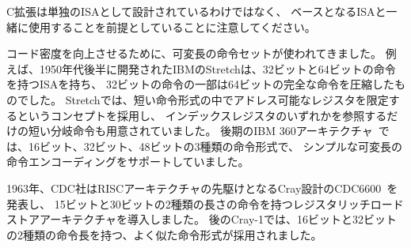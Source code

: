 \begin{comment}
It is important to note that the C extension is not designed to be a
stand-alone ISA, and is meant to be used alongside a base ISA.
\end{comment}

C拡張は単独のISAとして設計されているわけではなく、
ベースとなるISAと一緒に使用することを前提としていることに注意してください。

\begin{commentary}
\begin{comment}
Variable-length instruction sets have long been used to improve code
density.  For example, the IBM Stretch~\cite{stretch}, developed in
the late 1950s, had an ISA with 32-bit and 64-bit instructions, where
some of the 32-bit instructions were compressed versions of the full
64-bit instructions.  Stretch also employed the concept of limiting
the set of registers that were addressable in some of the shorter
instruction formats, with short branch instructions that could only
refer to one of the index registers.  The later IBM 360
architecture~\cite{ibm360} supported a simple variable-length
instruction encoding with 16-bit, 32-bit, or 48-bit instruction
formats.
\end{comment}

コード密度を向上させるために、可変長の命令セットが使われてきました。
例えば、1950年代後半に開発されたIBMのStretchは、32ビットと64ビットの命令を持つISAを持ち、
32ビットの命令の一部は64ビットの完全な命令を圧縮したものでした。
Stretchでは、短い命令形式の中でアドレス可能なレジスタを限定するというコンセプトを採用し、
インデックスレジスタのいずれかを参照するだけの短い分岐命令も用意されていました。
後期のIBM 360アーキテクチャ~\cite{ibm360}では、16ビット、32ビット、48ビットの3種類の命令形式で、
シンプルな可変長の命令エンコーディングをサポートしていました。

\begin{comment}
In 1963, CDC introduced the Cray-designed CDC 6600~\cite{cdc6600}, a
precursor to RISC architectures, that introduced a register-rich
load-store architecture with instructions of two lengths, 15-bits and
30-bits.  The later Cray-1 design used a very similar instruction
format, with 16-bit and 32-bit instruction lengths.
\end{comment}

1963年、CDC社はRISCアーキテクチャの先駆けとなるCray設計のCDC6600~\cite{cdc6600}を発表し、
15ビットと30ビットの2種類の長さの命令を持つレジスタリッチロードストアアーキテクチャを導入しました。
後のCray-1では、16ビットと32ビットの2種類の命令長を持つ、よく似た命令形式が採用されました。


\end{commentary}
